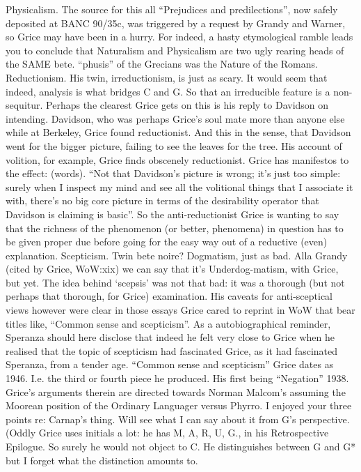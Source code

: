 \documentclass[10pt,titlepage]{book}
\begin{document}
Physicalism. The  source for this all “Prejudices and predilections”, now 
safely deposited at BANC  90/35c, was triggered by a request by Grandy and 
Warner, so Grice may have been  in a hurry. For indeed, a hasty etymological 
ramble leads you to conclude that  Naturalism and Physicalism are two ugly 
rearing heads of the SAME bete. “phusis”  of the Grecians was the Nature of 
the Romans.   
Reductionism. His  twin, irreductionism, is just as scary. It would seem 
that indeed, analysis is  what bridges C and G. So that an irreducible feature 
is a non-sequitur.  Perhaps the clearest Grice gets on this  is his reply 
to Davidson on intending. Davidson, who was perhaps Grice’s soul  mate more 
than anyone else while at Berkeley, Grice found reductionist. And this  in 
the sense, that Davidson went for the bigger picture, failing to see the  
leaves for the tree. His account of volition, for example, Grice finds obscenely 
 reductionist. Grice has manifestos to the effect: (words). “Not that 
Davidson’s  picture is wrong; it’s just too simple: surely when I inspect my 
mind and see  all the volitional things that I associate it with, there’s no 
big core picture  in terms of the desirability operator that Davidson is 
claiming is basic”. So  the anti-reductionist Grice is wanting to say that the 
richness of the  phenomenon (or better,  phenomena)  in question has to be 
given proper due before going for the easy way out of a  reductive (even) 
explanation. 
Scepticism. Twin  bete noire? Dogmatism, just as bad. Alla Grandy (cited by 
Grice, WoW:xix) we can  say that it’s Underdog-matism, with Grice, but yet. 
The idea behind ‘scepsis’  was not that bad: it was a thorough (but not 
perhaps that thorough, for Grice)  examination. His caveats for anti-sceptical 
views however were clear in those  essays Grice cared to reprint in WoW 
that bear titles like, “Common sense and  scepticism”. As a autobiographical 
reminder, Speranza should here disclose that  indeed he felt very close to 
Grice when he realised that the topic of scepticism  had fascinated Grice, as 
it had fascinated Speranza, from a tender age. “Common  sense and scepticism”
 Grice dates as 1946. I.e. the third or fourth piece he  produced. His 
first being “Negation” 1938. Grice’s arguments therein are  directed towards 
Norman Malcom’s assuming the Moorean position of the Ordinary  Languager 
versus Phyrro. 
I enjoyed your three points re: Carnap's thing. Will see what I can say  
about it from G's perspective. (Oddly Grice uses initials a lot: he has M, A, 
R,  U, G., in his Retrospective Epilogue. So surely he would not object to 
C. He  distinguishes between G and G* but I forget what the distinction 
amounts  to.
 
\end{document}
